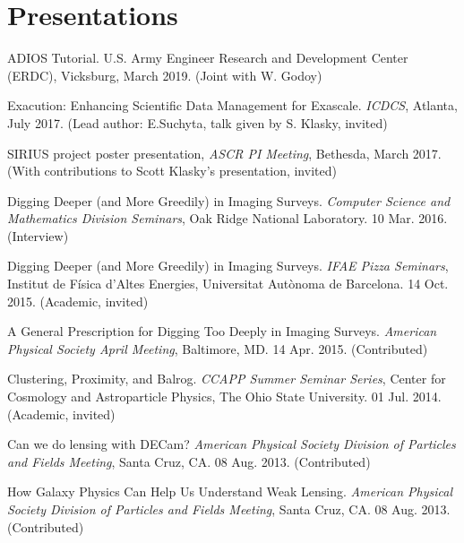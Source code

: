\documentclass[12pt,a4paper,sans]{moderncv}	%
\begin{document}


\section{Presentations}

\begin{achievements}
\item ADIOS Tutorial. U.S. Army Engineer Research and Development Center (ERDC), Vicksburg, March 2019. (Joint with W. Godoy)
\item Exacution: Enhancing Scientific Data Management for Exascale. \textit{ICDCS}, Atlanta, July 2017. (Lead author: E.Suchyta, talk given by S. Klasky, invited)
\item SIRIUS project poster presentation, \textit{ASCR PI Meeting}, Bethesda, March 2017. (With contributions to Scott Klasky's presentation, invited)
\item Digging Deeper (and More Greedily) in Imaging Surveys. \textit{Computer Science and Mathematics Division Seminars}, Oak Ridge National Laboratory. 10 Mar. 2016. (Interview)
\item Digging Deeper (and More Greedily) in Imaging Surveys. \textit{IFAE Pizza Seminars}, Institut de F\'isica d'Altes Energies, Universitat Aut\`onoma de Barcelona. 14 Oct. 2015. (Academic, invited)
\item A General Prescription for Digging Too Deeply in Imaging Surveys. \textit{American Physical Society April Meeting}, Baltimore, MD. 14 Apr. 2015. (Contributed)
\item Clustering, Proximity, and Balrog. \textit{CCAPP Summer Seminar Series}, Center for Cosmology and Astroparticle Physics, The Ohio State University. 01 Jul. 2014. (Academic, invited)
\item Can we do lensing with DECam? \textit{American Physical Society Division of Particles and Fields Meeting}, Santa Cruz, CA. 08 Aug. 2013.  (Contributed)
\item How Galaxy Physics Can Help Us Understand Weak Lensing. \textit{American Physical Society Division of Particles and Fields Meeting}, Santa Cruz, CA. 08 Aug. 2013.  (Contributed)
\end{achievements}
\end{document}
